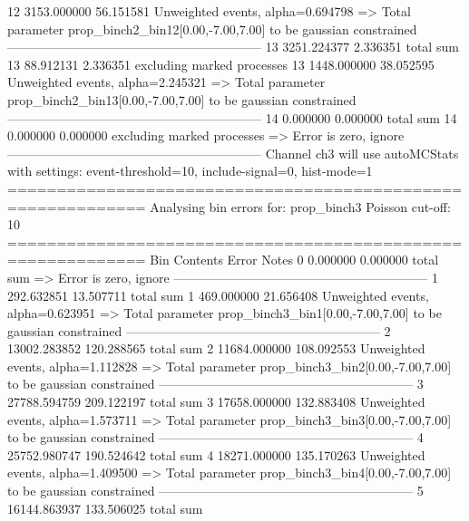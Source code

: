 12         3153.000000     56.151581       Unweighted events, alpha=0.694798
  => Total parameter prop_binch2_bin12[0.00,-7.00,7.00] to be gaussian constrained
------------------------------------------------------------
13         3251.224377     2.336351        total sum                     
13         88.912131       2.336351        excluding marked processes    
13         1448.000000     38.052595       Unweighted events, alpha=2.245321
  => Total parameter prop_binch2_bin13[0.00,-7.00,7.00] to be gaussian constrained
------------------------------------------------------------
14         0.000000        0.000000        total sum                     
14         0.000000        0.000000        excluding marked processes    
  => Error is zero, ignore      
------------------------------------------------------------
Channel ch3 will use autoMCStats with settings: event-threshold=10, include-signal=0, hist-mode=1
============================================================
Analysing bin errors for: prop_binch3
Poisson cut-off: 10
============================================================
Bin        Contents        Error           Notes                         
0          0.000000        0.000000        total sum                     
  => Error is zero, ignore      
------------------------------------------------------------
1          292.632851      13.507711       total sum                     
1          469.000000      21.656408       Unweighted events, alpha=0.623951
  => Total parameter prop_binch3_bin1[0.00,-7.00,7.00] to be gaussian constrained
------------------------------------------------------------
2          13002.283852    120.288565      total sum                     
2          11684.000000    108.092553      Unweighted events, alpha=1.112828
  => Total parameter prop_binch3_bin2[0.00,-7.00,7.00] to be gaussian constrained
------------------------------------------------------------
3          27788.594759    209.122197      total sum                     
3          17658.000000    132.883408      Unweighted events, alpha=1.573711
  => Total parameter prop_binch3_bin3[0.00,-7.00,7.00] to be gaussian constrained
------------------------------------------------------------
4          25752.980747    190.524642      total sum                     
4          18271.000000    135.170263      Unweighted events, alpha=1.409500
  => Total parameter prop_binch3_bin4[0.00,-7.00,7.00] to be gaussian constrained
------------------------------------------------------------
5          16144.863937    133.506025      total sum                     
